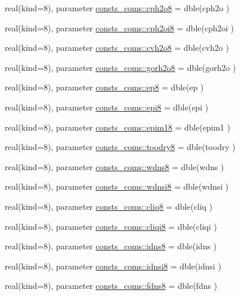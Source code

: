 \begin{DoxyCompactItemize}
\item 
real(kind=8), parameter \hyperlink{namespaceconsts__coms_a90db8cf818bbde30510ef7860ff55303}{consts\+\_\+coms\+::cph2o8} = dble(cph2o )
\item 
real(kind=8), parameter \hyperlink{namespaceconsts__coms_ab6e3f79e0fef1414f52ea43de9f00a3f}{consts\+\_\+coms\+::cph2oi8} = dble(cph2oi )
\item 
real(kind=8), parameter \hyperlink{namespaceconsts__coms_a164ea9d19363574220b5b326c8c7555f}{consts\+\_\+coms\+::cvh2o8} = dble(cvh2o )
\item 
real(kind=8), parameter \hyperlink{namespaceconsts__coms_a9ec374a4fc22a5bdf63ad6a718f91c40}{consts\+\_\+coms\+::gorh2o8} = dble(gorh2o )
\item 
real(kind=8), parameter \hyperlink{namespaceconsts__coms_ae3bc0b10058a229de8516c83c216041b}{consts\+\_\+coms\+::ep8} = dble(ep )
\item 
real(kind=8), parameter \hyperlink{namespaceconsts__coms_ac4526dc6415ddf34fb8185c076fd5521}{consts\+\_\+coms\+::epi8} = dble(epi )
\item 
real(kind=8), parameter \hyperlink{namespaceconsts__coms_a32f01e2fc04a575b499b3003989de443}{consts\+\_\+coms\+::epim18} = dble(epim1 )
\item 
real(kind=8), parameter \hyperlink{namespaceconsts__coms_a997a12f52740babd7a7fecce0c0d489b}{consts\+\_\+coms\+::toodry8} = dble(toodry )
\item 
real(kind=8), parameter \hyperlink{namespaceconsts__coms_a463ad608b496ab02211a70ecfb8ed002}{consts\+\_\+coms\+::wdns8} = dble(wdns )
\item 
real(kind=8), parameter \hyperlink{namespaceconsts__coms_ab48d9b767c6f90fe96cddded773dc846}{consts\+\_\+coms\+::wdnsi8} = dble(wdnsi )
\item 
real(kind=8), parameter \hyperlink{namespaceconsts__coms_a27eaa3711bac5d4a88b120716c62faef}{consts\+\_\+coms\+::cliq8} = dble(cliq )
\item 
real(kind=8), parameter \hyperlink{namespaceconsts__coms_a176ea09f14460ae7d396f53f93d59b55}{consts\+\_\+coms\+::cliqi8} = dble(cliqi )
\item 
real(kind=8), parameter \hyperlink{namespaceconsts__coms_a8edbbaf553f3bb97c6aa36fd02c06cbd}{consts\+\_\+coms\+::idns8} = dble(idns )
\item 
real(kind=8), parameter \hyperlink{namespaceconsts__coms_a9bbee47456466f45fb26089844e13c9b}{consts\+\_\+coms\+::idnsi8} = dble(idnsi )
\item 
real(kind=8), parameter \hyperlink{namespaceconsts__coms_ab8ff39ae2abc98414eb2bb5f536fd5a0}{consts\+\_\+coms\+::fdns8} = dble(fdns )

\end{DoxyCompactItemize}
